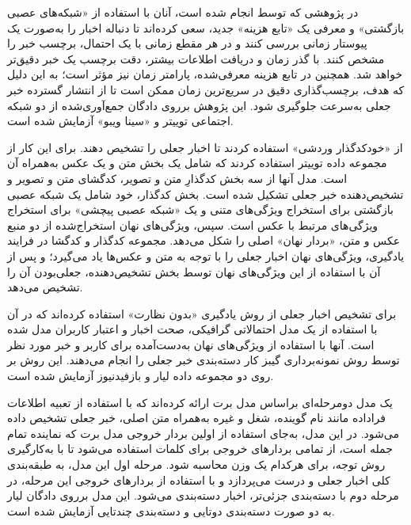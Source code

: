 در پژوهشی که توسط \citet{ramezani2019news} انجام شده ‌است، آنان با استفاده از «شبکه‌های عصبی بازگشتی» و معرفی یک «تابع هزینه» جدید، سعی کرده‌اند تا دنباله اخبار را به‌صورت یک پیوستار زمانی بررسی کنند و در هر مقطع زمانی با یک احتمال، برچسب خبر را مشخص کنند. با گذر زمان و دریافت اطلاعات بیشتر، دقت برچسب یک خبر دقیق‌تر خواهد شد. همچنین در تابع هزینه معرفی‌شده، پارامتر زمان نیز مؤثر است؛ به این دلیل که هدف، برچسب‌گذاری دقیق در سریع‌ترین زمان ممکن است تا از انتشار گسترده خبر جعلی به‌سرعت جلوگیری شود. این پژوهش برروی دادگان جمع‌آوری‌شده از دو شبکه اجتماعی توییتر و «سینا ویبو» آزمایش شده ‌است.

\citet{khattar2019mvae}   از  «خودکدگذار وردشی» استفاده کردند تا اخبار جعلی را تشخیص دهند. برای این کار از مجموعه داده توییتر استفاده کردند که شامل یک بخش متن و یک عکس به‌همراه آن است. مدل آنها از سه بخش کدگذارِ متن و تصویر، کدگشای متن و تصویر و تشخیص‌دهنده خبر جعلی تشکیل شده‌ است. بخش کدگذار، خود شامل یک شبکه عصبی بازگشتی برای استخراج ویژگی‌های متنی و یک «شبکه عصبی پیچشی» برای استخراج ویژگی‌های مرتبط با عکس است. سپس، ویژگی‌های نهان استخراج‌شده از دو منبع عکس و متن، «بردار نهان» اصلی را شکل می‌دهد. مجموعه کدگذار و کدگشا در فرایند یادگیری، ویژگی‌های نهان اخبار جعلی را با توجه به متن و عکس‌ها یاد می‌گیرد؛ و پس از آن با استفاده از این ویژگی‌های نهان توسط بخش تشخیص‌دهنده، جعلی‌بودن آن را تشخیص می‌دهد.  %

\citet{yang2019unsupervised}  برای تشخیص اخبار جعلی از روش یادگیری «بدون نظارت» استفاده کرده‌اند که در آن با استفاده از  یک مدل احتمالاتی گرافیکی، صحت اخبار و اعتبار کاربران مدل شده‌ است. آنها با استفاده از ویژگی‌های نهان به‌دست‌آمده برای  کاربر و خبر مورد نظر توسط روش نمونه‌برداری گیبز کار دسته‌بندی خبر جعلی را انجام می‌دهند. این روش بر روی دو مجموعه داده لیار  \citep{wang2017liar} و بازفیدنیوز آزمایش شده‌ است. %

\citet{liu2019two} یک مدل دومرحله‌ای براساس مدل برت ارائه کرده‌اند که با استفاده از تعبیه اطلاعات فراداده مانند نام
 گوینده، شغل و غیره به‌همراه متن اصلی، خبر جعلی تشخیص داده می‌شود. در این مدل، به‌جای استفاده از اولین بردار خروجی مدل برت که نماینده تمام جمله است، از تمامی بردارهای خروجی برای کلمات استفاده می‌شود تا با به‌کارگیری روش توجه، برای
 هرکدام یک وزن محاسبه شود. مرحله اول این مدل، به طبقه‌بندی کلی اخبار جعلی و درست می‌پردازد و با استفاده از بردارهای خروجی این مرحله، در مرحله دوم با دسته‌بندی جزئی‌تر، اخبار دسته‌بندی می‌شود. این مدل برروی دادگان لیار به دو صورت دسته‌بندی دوتایی و دسته‌بندی چندتایی آزمایش شده است.%

